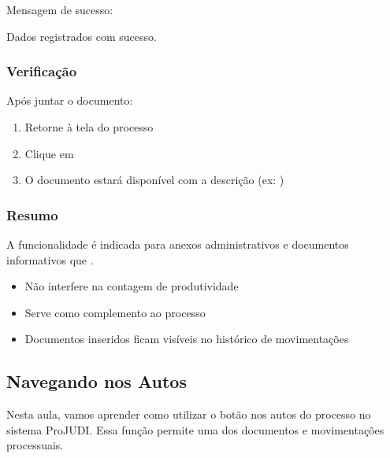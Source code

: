 \documentclass[letterpaper,10pt,brazil]{sphinxmanual}
\begin{document}
\sphinxAtStartPar
Mensagem de sucesso:

\sphinxAtStartPar
Dados registrados com sucesso.


\subsubsection{Verificação}
\label{\detokenize{projud_15_juntardocumento:verificacao}}
\sphinxAtStartPar
Após juntar o documento:
\begin{enumerate}
%
\item {} 
\sphinxAtStartPar
Retorne à tela do processo

\item {} 
\sphinxAtStartPar
Clique em 

\item {} 
\sphinxAtStartPar
O documento estará disponível com a descrição (ex: )

\end{enumerate}


\subsubsection{Resumo}
\label{\detokenize{projud_15_juntardocumento:resumo}}
\sphinxAtStartPar
A funcionalidade  é indicada para anexos administrativos e documentos informativos que .
\begin{itemize}
\item {} 
\sphinxAtStartPar
Não interfere na contagem de produtividade

\item {} 
\sphinxAtStartPar
Serve como complemento ao processo

\item {} 
\sphinxAtStartPar
Documentos inseridos ficam visíveis no histórico de movimentações

\end{itemize}

\sphinxstepscope


\subsection{Navegando nos Autos}
\label{\detokenize{projud_16_navegandoprocessos:navegando-nos-autos}}\label{\detokenize{projud_16_navegandoprocessos::doc}}
\sphinxAtStartPar
Nesta aula, vamos aprender como utilizar o botão  nos autos do processo no sistema ProJUDI. Essa função permite uma  dos documentos e movimentações processuais.
\end{document}
